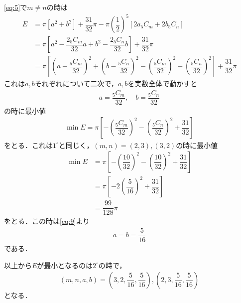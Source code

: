 \documentclass[../../main.tex]{subfiles}
\begin{document}
\cref{eq:5}で$m \neq n$の時は
\begin{align}
  E
  &= \pi\left[a^2+b^2\right] + \dfrac{31}{32}\pi
  - \pi \left( \dfrac{1}{2} \right)^5 \left[2a {}_5C_m + 2b {}_5C_n \right] \\
  &= \pi\left[a^2 - \dfrac{2{}_5C_m}{32}a + b^2 - \dfrac{2{}_5C_n}{32}b \right] + \dfrac{31}{32}\pi  \\
  &= \pi\left[\left(a-\dfrac{{}_5C_m}{32}\right)^2 + \left(b-\dfrac{{}_5C_n}{32}\right)^2 - \left(\dfrac{{}_5C_m}{32}\right)^2 - \left(\dfrac{{}_5C_n}{32}\right)^2\right]
  + \dfrac{31}{32}\pi  \label{eq:8}
\end{align}
これは$a,b$それぞれについて二次で，$a,b$を実数全体で動かすと
\begin{align}
  a = \dfrac{{}_5C_m}{32},
  \quad
  b = \dfrac{{}_5C_n}{32} \label{eq:9}
\end{align}
の時に最小値
\begin{align}
  \min E = \pi\left[- \left(\dfrac{{}_5C_m}{32}\right)^2 - \left(\dfrac{{}_5C_n}{32}\right)^2 + \dfrac{31}{32} \right]
\end{align}
をとる．これは$1^{\circ}$と同じく，$(m,n)=(2,3), (3,2)$の時に最小値
\begin{align}
  \min E
  & = \pi\left[- \left(\dfrac{10}{32}\right)^2 - \left(\dfrac{10}{32}\right)^2 + \dfrac{31}{32} \right] \\
  & = \pi\left[- 2\left(\dfrac{5}{16}\right)^2 + \dfrac{31}{32} \right] \\
  & = \dfrac{99}{128}\pi
\end{align}
をとる．この時は\cref{eq:9}より
\begin{align}
  a = b = \dfrac{5}{16}
\end{align}
である．
\casesend

以上から$E$が最小となるのは$2^{\circ}$の時で，
\begin{align}
  (m,n,a,b) = \left(3, 2, \dfrac{5}{16}, \dfrac{5}{16}\right), \left(2, 3, \dfrac{5}{16}, \dfrac{5}{16}\right)
\end{align}
となる．
\end{document}

